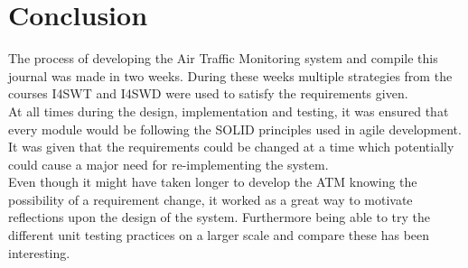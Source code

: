 \section{Conclusion}
The process of developing the Air Traffic Monitoring system and compile this journal was made in two weeks. During these weeks multiple strategies from the courses I4SWT and I4SWD were used to satisfy the requirements given. \\ 
At all times during the design, implementation and testing, it was ensured that every module would be following the SOLID principles used in agile development. It was given that the requirements could be changed at a time which potentially could cause a major need for re-implementing the system. \\
Even though it might have taken longer to develop the ATM knowing the possibility of a requirement change, it worked as a great way to motivate reflections upon the design of the system. Furthermore being able to try the different unit testing practices on a larger scale and compare these has been interesting.